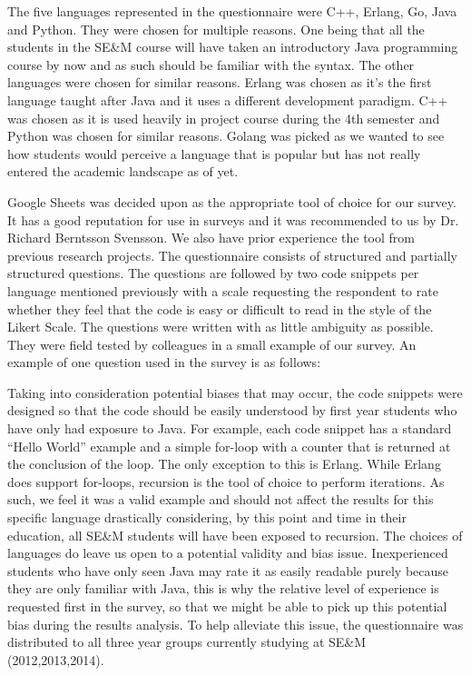 \documentclass[times, 10pt,twocolumn]{Article}
\begin{document}

The five languages represented in the questionnaire were C++, Erlang, Go, Java and Python. They were chosen for multiple reasons. One being that all the students in the SE\&M course will have taken an introductory Java programming course by now and as such should be familiar with the syntax. The other languages were chosen for similar reasons. Erlang was chosen as it's the first language taught after Java and it uses a different development paradigm. C++ was chosen as it is used heavily in project course during the 4th semester and Python was chosen for similar reasons. Golang was picked as we wanted to see how students would perceive a language that is popular but has not really entered the academic landscape as of yet.

Google Sheets was decided upon as the appropriate tool of choice for our survey. It has a good reputation for use in surveys and it was recommended to us by Dr. Richard Berntsson Svensson. We also have prior experience the tool from previous research projects.
The questionnaire consists of structured and partially structured questions. The questions are followed by two code snippets per language mentioned previously with a scale requesting the respondent to rate whether they feel that the code is easy or difficult to read in the style of the Likert Scale. The questions were written with as little ambiguity as possible. They were field tested by colleagues in a small example of our survey. An example of one question used in the survey is as follows:

Taking into consideration potential biases that may occur, the code snippets were designed so that the code should be easily understood by first year students who have only had exposure to Java. For example, each code snippet has a standard ``Hello World'' example and a simple for-loop with a counter that is returned at the conclusion of the loop. The only exception to this is Erlang. While Erlang does support for-loops, recursion is the tool of choice to perform iterations. As such, we feel it was a valid example and should not affect the results for this specific language drastically considering, by this point and time in their education, all SE\&M students will have been exposed to recursion. The choices of languages do leave us open to a potential validity and bias issue. Inexperienced students who have only seen Java may rate it as easily readable purely because they are only familiar with Java, this is why the relative level of experience is requested first in the survey, so that we might be able to pick up this potential bias during the results analysis. To help alleviate this issue, the questionnaire was distributed to all three year groups currently studying at SE\&M (2012,2013,2014).
\end{document}
